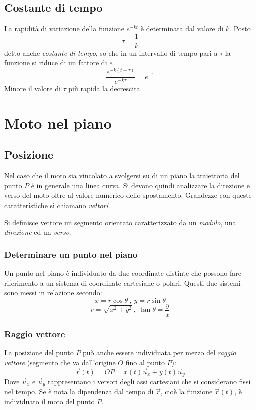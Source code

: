 \documentclass[class=book, crop=false, oneside, 12pt]{standalone}
\begin{document}
	\subsection{Costante di tempo}
	La rapidità di variazione della funzione $e^{-kt}$ è determinata dal valore di $k$.
	Posto
	$$\tau = \dfrac{1}{k}$$
	detto anche \emph{costante di tempo}, so che in un intervallo di tempo pari a $\tau$ la funzione si riduce di un fattore di $e$
	$$\frac{e^{-k\left(t + \tau\right)}}{e^{-k \tau}} = e^{-1}$$
	Minore il valore di $\tau$ pi\`u rapida la decrescita.

\section{Moto nel piano}
  \subsection{Posizione}
  Nel caso che il moto sia vincolato a svolgersi su di un piano la traiettoria del punto $P$ è in generale  una linea curva.
  Si devono quindi analizzare la direzione e verso del moto oltre al valore numerico dello spostamento.
  Grandezze con queste caratteristiche si chiamano \emph{vettori}.

  Si definisce vettore un segmento orientato caratterizzato da un \emph{modulo}, una \emph{direzione} ed un \emph{verso}.
    \subsubsection{Determinare un punto nel piano}
    Un punto nel piano \`e individuato da due coordinate distinte che possono fare riferimento a un sistema di coordinate cartesiane o polari.
    Questi due sistemi sono messi in relazione secondo:
    \begin{equation}
      x = r \cos \theta \ , \ y = r \sin \theta
    \end{equation}
    \begin{equation}
      r = \sqrt{x^2 + y^2 } \ , \ \tan \theta = \frac{y}{x}
    \end{equation}
    \subsubsection{Raggio vettore}
    La posizione del punto \(P\) può anche essere individuata per mezzo del \emph{raggio vettore} (segmento che va dall'origine \(O\) fino al punto \(P\)):
    \begin{equation}
      \overrightarrow{r}(t) = OP = x(t) \overrightarrow{u}_x + y(t) \overrightarrow{u}_y
    \end{equation}
    Dove \(\overrightarrow{u}_x\) e \(\overrightarrow{u}_y\) rappresentano i versori degli assi cartesiani che si considerano fissi nel tempo.
    Se è nota la dipendenza dal tempo di \(\overrightarrow{r}\), cioè la funzione \(\overrightarrow{r}(t)\), è individuato il moto del punto \(P\).
\end{document}
